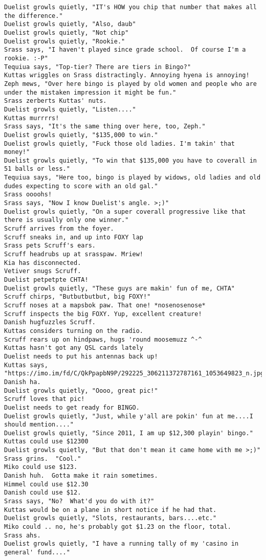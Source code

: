 \begin{verbatim}
Duelist growls quietly, "IT's HOW you chip that number that makes all the difference."
Duelist growls quietly, "Also, daub"
Duelist growls quietly, "Not chip"
Duelist growls quietly, "Rookie."
Srass says, "I haven't played since grade school.  Of course I'm a rookie. :-P"
Tequiua says, "Top-tier? There are tiers in Bingo?"
Kuttas wriggles on Srass distractingly. Annoying hyena is annoying!
Zeph mews, "Over here bingo is played by old women and people who are under the mistaken impression it might be fun."
Srass zerberts Kuttas' nuts.
Duelist growls quietly, "Listen...."
Kuttas murrrrs!
Srass says, "It's the same thing over here, too, Zeph."
Duelist growls quietly, "$135,000 to win."
Duelist growls quietly, "Fuck those old ladies. I'm takin' that money!"
Duelist growls quietly, "To win that $135,000 you have to coverall in 51 balls or less."
Tequiua says, "Here too, bingo is played by widows, old ladies and old dudes expecting to score with an old gal."
Srass oooohs!
Srass says, "Now I know Duelist's angle. >;)"
Duelist growls quietly, "On a super coverall progressive like that there is usually only one winner."
Scruff arrives from the foyer.
Scruff sneaks in, and up into FOXY lap
Srass pets Scruff's ears.
Scruff headrubs up at srasspaw. Mriew!
Kia has disconnected.
Vetiver snugs Scruff.
Duelist petpetpte CHTA!
Duelist growls quietly, "These guys are makin' fun of me, CHTA"
Scruff chirps, "Butbutbutbut, big FOXY!"
Scruff noses at a mapsbok paw. That one! *nosenosenose*
Scruff inspects the big FOXY. Yup, excellent creature!
Danish hugfuzzles Scruff.
Kuttas considers turning on the radio.
Scruff rears up on hindpaws, hugs 'round moosemuzz ^-^
Kuttas hasn't got any QSL cards lately
Duelist needs to put his antennas back up!
Kuttas says, "https://imo.im/fd/C/QkPpapbN9P/292225_306211372787161_1053649823_n.jpg"
Danish ha.
Duelist growls quietly, "Oooo, great pic!"
Scruff loves that pic!
Duelist needs to get ready for BINGO.
Duelist growls quietly, "Just, while y'all are pokin' fun at me....I should mention...."
Duelist growls quietly, "Since 2011, I am up $12,300 playin' bingo."
Kuttas could use $12300
Duelist growls quietly, "But that don't mean it came home with me >;)"
Srass grins.  "Cool."
Miko could use $123.
Danish huh.  Gotta make it rain sometimes.
Himmel could use $12.30
Danish could use $12.
Srass says, "No?  What'd you do with it?"
Kuttas would be on a plane in short notice if he had that.
Duelist growls quietly, "Slots, restaurants, bars....etc."
Miko could .. no, he's probably got $1.23 on the floor, total.
Srass ahs.
Duelist growls quietly, "I have a running tally of my 'casino in general' fund...."

\end{verbatim}
